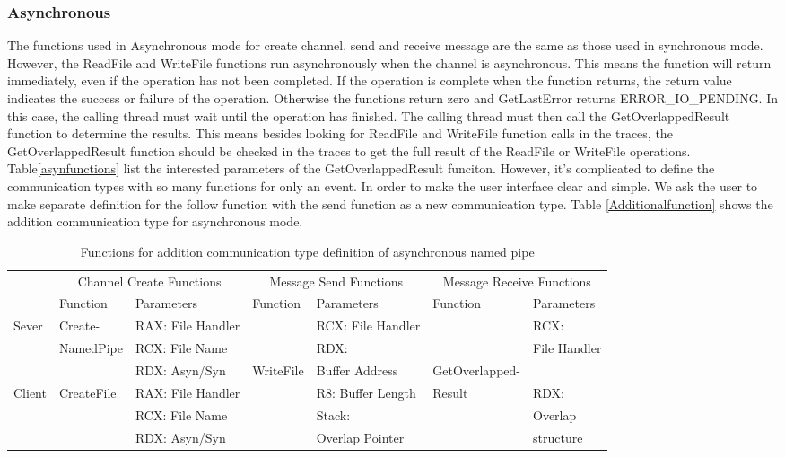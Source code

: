 \documentclass[paper=a4, fontsize=11pt]{scrartcl}
\numberwithin{equation}{section}		%
\numberwithin{figure}{section}			%
\numberwithin{table}{section}				%
\begin{document}
\subsubsection{Asynchronous}
The functions used in Asynchronous mode for create channel, send and receive message are the same as those used in synchronous mode. However,  the ReadFile and WriteFile functions run asynchronously when the channel is asynchronous. This means the function will return immediately, even if the operation has not been completed. If the operation is complete when the function returns, the return value indicates the success or failure of the operation. Otherwise the functions return zero and GetLastError returns ERROR\_IO\_PENDING. In this case, the calling thread must wait until the operation has finished. The calling thread must then call the GetOverlappedResult function to determine the results. This means besides looking for ReadFile and WriteFile function calls in the traces, the GetOverlappedResult function should be checked in the traces to get the full result of the ReadFile or WriteFile operations. Table\ref{asynfunctions} list the interested parameters of the GetOverlappedResult funciton. However, it's complicated to define the communication types with so many functions for only an event. In order to make the user interface clear and simple. We ask the user to make separate definition for the follow function with the send function as a new communication type. Table \ref{Additionalfunction} shows the addition communication type for asynchronous mode.

\begin{table}[h]
        \centering
        \caption{Functions for addition communication type definition of asynchronous named pipe}
        \label{synfunctions}
        \begin{tabular}{|l|l|l|l|l|l|l|}
            \hline
             \multirow{2}{*}{} &
               \multicolumn{2}{c|}{Channel Create Functions} &
               \multicolumn{2}{c|}{Message Send Functions} &
               \multicolumn{2}{c|}{Message Receive Functions} \\
             \cline{2-7}
              & Function& Parameters & Function & Parameters  & Function & Parameters\\
             \hline
             Sever& Create-&  RAX: File Handler &  &  RCX: File Handler &&RCX: \\
             \cline{3-3} \cline{5-5} 
             &NamedPipe&RCX: File Name && RDX:  && File Handler\\
              \cline{3-3} 
             &&RDX: Asyn/Syn&WriteFile& Buffer Address &GetOverlapped-&\\
                \cline{1-3} \cline{5-5} \cline{7-7}
             Client & CreateFile & RAX: File Handler & &  R8: Buffer Length &Result&RDX:\\
              \cline{3-3} \cline{5-5} 
             &&RCX: File Name &&Stack:&&Overlap\\
             \cline{3-3} 
             &&RDX: Asyn/Syn&& Overlap Pointer&&structure\\
            \hline
        \end{tabular}
    \end{table}
    
\end{document}

